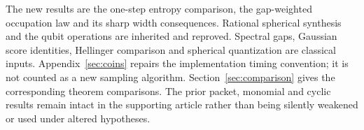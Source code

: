 The new results are the one-step entropy comparison, the gap-weighted
occupation law and its sharp width consequences. Rational spherical
synthesis and the qubit operations are inherited and reproved. Spectral
gaps, Gaussian score identities, Hellinger comparison and spherical
quantization are classical inputs. Appendix~\ref{sec:coins} repairs the
implementation timing convention; it is not counted as a new sampling
algorithm. Section~\ref{sec:comparison} gives the corresponding theorem
comparisons. The prior packet, monomial and cyclic results remain intact
in the supporting article rather than being silently weakened or used
under altered hypotheses.
